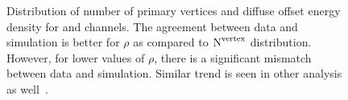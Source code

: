 \begin{figure}
    \centering  
    \vfil
    \caption{Distribution of number of primary vertices and diffuse offset energy density 
	for \mujets and \ejets channels. The agreement between data and simulation is better 
	for $\rho$ as compared to $\rm{N}^{\text{vertex}}$ distribution. However, for lower values 
	of $\rho$, there is a significant mismatch between data and simulation. Similar trend is 
	seen in other analysis as well~\cite{CMS-AN-17-003, CMS-AN-17-116}.}
    \label{fig:nvtxRho}
\end{figure}

